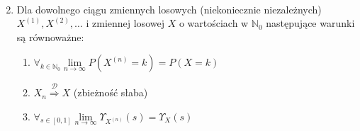 \begin{twr}
\begin{enumerate}
\begin{gather*}
\end{gather*}
\item Dla dowolnego ciągu zmiennych losowych (niekoniecznie niezależnych) $ X^{(1)},X^{(2)},\dots $ i zmiennej losowej $ X $ o wartościach w $ \mathbb N _0 $ następujące warunki są równoważne:
\begin{enumerate}
\item $ \forall_{k\in \mathbb N _0}\lim\limits_{n\to\infty} P\left(X^{(n)}=k\right)=P\left(X=k\right) $
\item $ X_n\overset{\mathcal D}{\Rightarrow}X $ (zbieżność słaba)
\item $ \forall_{s\in[0,1]}\lim\limits_{n\to\infty} \Upsilon_{X^{(n)}}(s)=\Upsilon_X(s) $
\end{enumerate}
\end{enumerate}
\end{twr}
